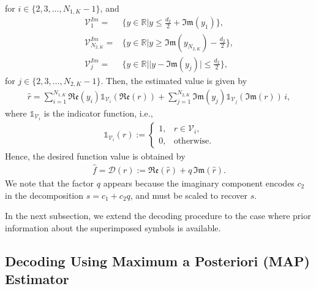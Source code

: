 \documentclass[journal,12pt,onecolumn,draftclsnofoot]{IEEEtran}
\theoremstyle{definition}
\begin{document}
for $i\in \{2,3,\ldots,N_{1,K}-1\}$, and   
\begin{subequations}
\label{eq:Voronoi_Im}
    \begin{align}
    \mathcal{V}_1^{Im} = &\Big\{y\in \mathbb{R}| y \leq \frac{d_2}{2}+\mathfrak{Im}(y_1)\Big\}, \\\mathcal{V}_{N_{2,K}}^{Im} =& \Big\{y\in \mathbb{R}| y \geq \mathfrak{Im}(y_{N_{2,K}})-\frac{d_2}{2}\Big\}, \\
    \mathcal{V}_j^{Im} =& \Big\{y\in \mathbb{R}| |y - \mathfrak{Im}(y_j)|\leq \frac{d_2}{2}\Big\},
\end{align}
\end{subequations}
for $j\in \{2,3,\ldots,N_{2,K}-1\}$. Then, the estimated value is given by 
\begin{align}
    \hat{r} =  \sum_{i=1}^{N_{1,K}} \mathfrak{Re}(y_{i})\mathds{1}_{\mathcal{V}_i}(\mathfrak{Re}(r)) + \sum_{j=1}^{N_{2,K}} \mathfrak{Im}(y_j)\mathds{1}_{\mathcal{V}_j}(\mathfrak{Im}(r))\,i,
\end{align} 
where $\mathds{1}_{\mathcal{V}_i}$ is the indicator function, i.e.,  
\begin{align}
    \mathds{1}_{\mathcal{V}_i}(r):= \begin{cases}
            1, &    r \in \mathcal{V}_i, \\
            0, & \text{otherwise}.
        \end{cases}
\end{align}
Hence, the desired function value is obtained by 
\begin{align}
   \label{eq:deocder_qam}
    \hat{f} = \mathscr{D}(r) := \mathfrak{Re}(\hat{r}) + q\,\mathfrak{Im}(\hat{r}).
\end{align}
We note that the factor $q$ appears because the imaginary component encodes $c_2$ in the decomposition $s=c_1+c_2q$, and must be scaled to recover $s$.

In the next subsection, we extend the decoding procedure to the case where prior information about the superimposed symbols is available. 


\subsection{Decoding Using Maximum a Posteriori (MAP) Estimator}\label{sec:MAPDecoder}
\end{document}
